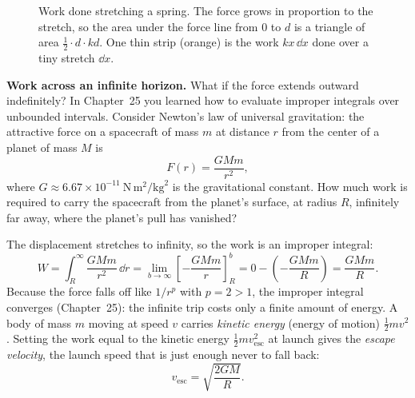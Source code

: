 \begin{figure}[htbp]
\centering
{}
\caption{Work done stretching a spring. The force grows in proportion to the stretch,
so the area under the force line from $0$ to $d$ is a triangle of area
$\tfrac12\cdot d\cdot kd$. One thin strip (orange) is the work $kx\,\dd x$ done over a
tiny stretch $\dd x$.}
\label{ch26:fig-spring}
\end{figure}

\begin{connectionbox}
\textbf{Work across an infinite horizon.} What if the force extends outward indefinitely?
In Chapter~25 you learned how to evaluate improper integrals over unbounded intervals.
Consider Newton's law of universal gravitation: the attractive force on a spacecraft of mass
$m$ at distance $r$ from the center of a planet of mass $M$ is
\[
  F(r) = \frac{G M m}{r^2},
\]
where $G \approx 6.67\times 10^{-11}\ \text{N}\,\text{m}^2/\text{kg}^2$ is the
gravitational constant. How much work is required to carry the spacecraft from the
planet's surface, at radius $R$, infinitely far away, where the planet's pull has
vanished?

The displacement stretches to infinity, so the work is an improper integral:
\[
  W = \int_R^{\infty} \frac{G M m}{r^2}\,\dd r
    = \lim_{b\to\infty}\left[ -\frac{G M m}{r} \right]_R^b
    = 0 - \left(-\frac{G M m}{R}\right)
    = \frac{G M m}{R}.
\]
Because the force falls off like $1/r^p$ with $p=2>1$, the improper integral
converges (Chapter~25): the infinite trip costs only a finite amount of energy. A
body of mass $m$ moving at speed $v$ carries \emph{kinetic energy} (energy of motion)
$\tfrac12 m v^2$. Setting the work equal to the kinetic energy
$\tfrac{1}{2}m v_{\text{esc}}^2$ at launch gives the \emph{escape velocity}, the
launch speed that is just enough never to fall back:
\[
  v_{\text{esc}} = \sqrt{\frac{2GM}{R}}.
\]
\end{connectionbox}

